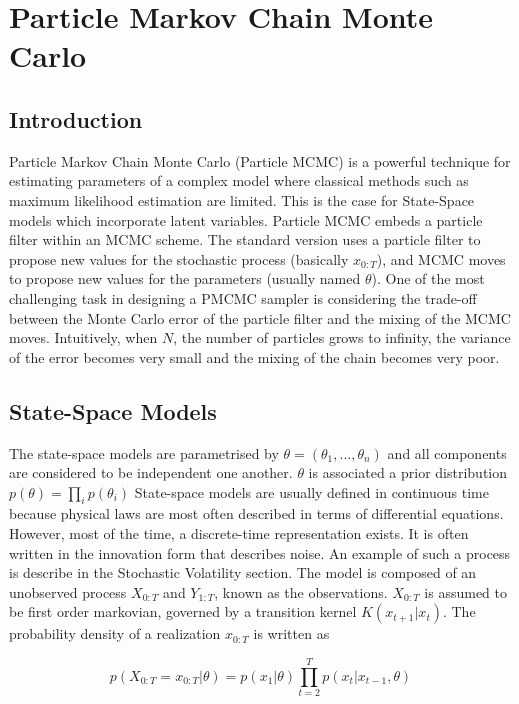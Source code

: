 \documentclass[11pt,a4,twosided,singlespacing,titlepagenumber=on]{scrreprt}
\numberwithin{equation}{chapter} %
\theoremstyle{remark}
\begin{document}
\chapter{Particle Markov Chain Monte Carlo}

\section{Introduction}
Particle Markov Chain Monte Carlo (Particle MCMC) is a powerful technique for estimating parameters of a complex model where classical methods such as maximum likelihood estimation are limited. This is the case for State-Space models which incorporate latent variables. Particle MCMC embeds a particle filter within an MCMC scheme. The standard version uses a particle filter to propose new values for the stochastic process (basically $x_{0:T}$), and MCMC moves to propose new values for the parameters (usually named $\theta$). One of the most challenging task in designing a PMCMC sampler is considering the trade-off between the Monte Carlo error of the particle filter and the mixing of the MCMC moves. Intuitively, when $N$, the number of particles grows to infinity, the variance of the error becomes very small and the mixing of the chain becomes very poor.

\section{State-Space Models}
The state-space models are parametrised by $\theta = (\theta_1,...,\theta_n)$ and all components are considered to be independent one another. $\theta$ is associated a prior distribution $p(\theta) = \prod_i p(\theta_i)$ State-space models are usually defined in continuous time because physical laws are most often described in terms of differential equations. However, most of the time, a discrete-time representation exists. It is often written in the innovation form that describes noise. An example of such a process is describe in the Stochastic Volatility section. The model is composed of an unobserved process $X_{0:T}$ and $Y_{1:T}$, known as the observations. $X_{0:T}$ is assumed to be first order markovian, governed by a transition kernel $K(x_{t+1}|x_t)$. The probability density of a realization $x_{0:T}$ is written as

\begin{equation}
p(X_{0:T} = x_{0:T} | \theta) = p(x_1|\theta) \prod_{t=2}^T p(x_t|x_{t-1}, \theta) 
\end{equation}
\end{document}
